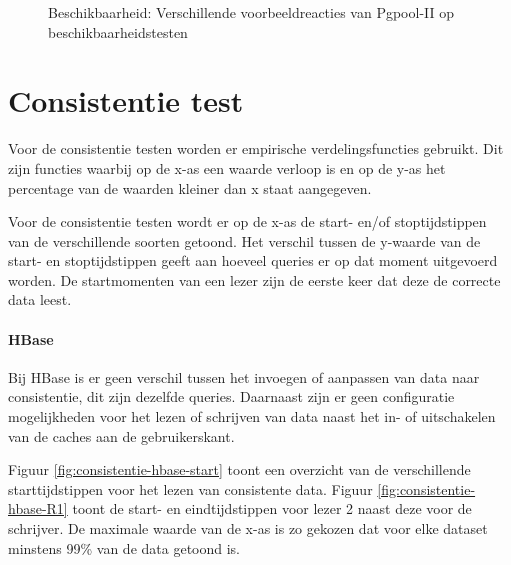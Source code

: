 \begin{figure}[ht!]
	\caption{Beschikbaarheid: Verschillende voorbeeldreacties van Pgpool-II op beschikbaarheidstesten }
	\label{fig:beschikbaar-pgpool}
\end{figure}

\section{Consistentie test}
Voor de consistentie testen worden er empirische verdelingsfuncties gebruikt. Dit zijn functies waarbij op de x-as een waarde verloop is en op de y-as het percentage van de waarden kleiner dan x staat aangegeven.

Voor de consistentie testen wordt er op de x-as de start- en/of stoptijdstippen van de verschillende soorten getoond. Het verschil tussen de y-waarde van de start- en stoptijdstippen geeft aan hoeveel queries er op dat moment uitgevoerd worden. De startmomenten van een lezer zijn de eerste keer dat deze de correcte data leest.    

\paragraph{HBase}
Bij HBase is er geen verschil tussen het invoegen of aanpassen van data naar consistentie, dit zijn dezelfde queries. Daarnaast zijn er geen configuratie mogelijkheden voor het lezen of schrijven van data naast het in- of uitschakelen van de caches aan de gebruikerskant. 

Figuur \ref{fig:consistentie-hbase-start} toont een overzicht van de verschillende starttijdstippen voor het lezen van consistente data. Figuur \ref{fig:consistentie-hbase-R1} toont de start- en eindtijdstippen voor lezer 2 naast deze voor de schrijver. De maximale waarde van de x-as is zo gekozen dat voor elke dataset minstens 99\% van de data getoond is. 

